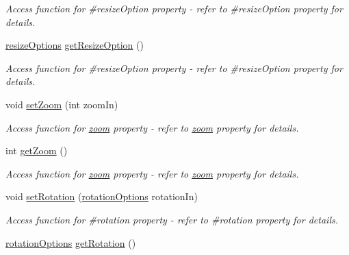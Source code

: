 \begin{DoxyCompactItemize}
\begin{DoxyCompactList}\small\item\em Access function for \#resizeOption property -\/ refer to \#resizeOption property for details. \end{DoxyCompactList}\item 
\hypertarget{classQEImage_aef5580ae2d6244d2935815a3fb8aeee3}{
\hyperlink{classQEImage_ab70b57397dad6bbe6e659f9831a481dd}{resizeOptions} \hyperlink{classQEImage_aef5580ae2d6244d2935815a3fb8aeee3}{getResizeOption} ()}
\label{classQEImage_aef5580ae2d6244d2935815a3fb8aeee3}

\begin{DoxyCompactList}\small\item\em Access function for \#resizeOption property -\/ refer to \#resizeOption property for details. \end{DoxyCompactList}\item 
\hypertarget{classQEImage_a543b8930de9d49fb49b4cfc27c7bdf79}{
void \hyperlink{classQEImage_a543b8930de9d49fb49b4cfc27c7bdf79}{setZoom} (int zoomIn)}
\label{classQEImage_a543b8930de9d49fb49b4cfc27c7bdf79}

\begin{DoxyCompactList}\small\item\em Access function for \hyperlink{classQEImage_acc75dbfecaa2e75d9bcf7c11384f3465}{zoom} property -\/ refer to \hyperlink{classQEImage_acc75dbfecaa2e75d9bcf7c11384f3465}{zoom} property for details. \end{DoxyCompactList}\item 
\hypertarget{classQEImage_a5004ee9569f362c059e12fd6a2196866}{
int \hyperlink{classQEImage_a5004ee9569f362c059e12fd6a2196866}{getZoom} ()}
\label{classQEImage_a5004ee9569f362c059e12fd6a2196866}

\begin{DoxyCompactList}\small\item\em Access function for \hyperlink{classQEImage_acc75dbfecaa2e75d9bcf7c11384f3465}{zoom} property -\/ refer to \hyperlink{classQEImage_acc75dbfecaa2e75d9bcf7c11384f3465}{zoom} property for details. \end{DoxyCompactList}\item 
\hypertarget{classQEImage_abb03fd56c63d06194713faf6bd0b7323}{
void \hyperlink{classQEImage_abb03fd56c63d06194713faf6bd0b7323}{setRotation} (\hyperlink{classQEImage_af3827d9fcef5cb397ac947e48558208a}{rotationOptions} rotationIn)}
\label{classQEImage_abb03fd56c63d06194713faf6bd0b7323}

\begin{DoxyCompactList}\small\item\em Access function for \#rotation property -\/ refer to \#rotation property for details. \end{DoxyCompactList}\item 
\hypertarget{classQEImage_ac2f159260b376366863e4941aaac8434}{
\hyperlink{classQEImage_af3827d9fcef5cb397ac947e48558208a}{rotationOptions} \hyperlink{classQEImage_ac2f159260b376366863e4941aaac8434}{getRotation} ()}
\label{classQEImage_ac2f159260b376366863e4941aaac8434}


\end{DoxyCompactItemize}
